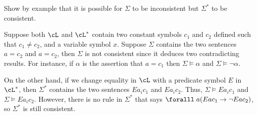 \begin{problem}
\begin{enumalph}
    \item Show by example that it is possible for $\Sigma$ to be inconsistent
      but $\Sigma^*$ to be consistent.
      \begin{Answer}
        Suppose both $\cL$ and $\cL^*$ contain two constant symbols $c_1$
        and $c_2$ defined such that $c_1 \ne c_2$, and a variable symbol $x$.
        Suppose $\Sigma$ contains the two sentences $a = c_2$ and $a = c_2$,
        then $\Sigma$ is not consistent since it deduces two contradicting
        results. For instance, if $\alpha$ is the assertion that $a = c_1$
        then $\Sigma \models \alpha$ and $\Sigma \models \lnot \alpha$.
        
        \step
        On the other hand, if we change equality in $\cL$ with a predicate
        symbol $E$ in $\cL^*$,
        then $\Sigma^*$ contains the two sentences
        $E a_i c_1$ and $E a_i c_2$. Thus, $\Sigma \models E a_i c_1$
        and $\Sigma \models E a_i c_2$. However, there is no rule
        in $\Sigma^*$ that says $\forall a (E a c_1 \lto \lnot E a c_2)$,
        so $\Sigma^*$ is still consistent.
      \end{Answer}
  \end{enumalph}

\end{problem}
